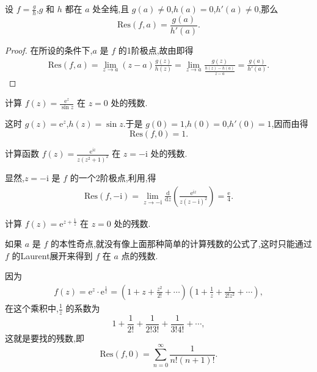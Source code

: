 \documentclass[../../main.tex]{subfiles}
\begin{document}
\begin{proposition}\label{proposition:命题5.4.5}
设 \( f = \frac{g}{h} \),\( g \) 和 \( h \) 都在 \( a \) 处全纯,且 \( g(a) \neq 0 \),\( h(a) = 0 \),\( h'(a) \neq 0 \),那么
\[
\mathrm{Res}(f,a) = \frac{g(a)}{h'(a)}.
\]
\end{proposition}
\begin{proof}
在所设的条件下,\( a \) 是 \( f \) 的1阶极点,故由即得
\begin{align*}
\mathrm{Res}(f,a) = \lim_{z \to a} (z - a) \frac{g(z)}{h(z)} = \lim_{z \to a} \frac{g(z)}{\frac{h(z) - h(a)}{z - a}} = \frac{g(a)}{h'(a)}.
\end{align*}

\end{proof}

\begin{example}
计算 \( f(z) = \frac{\mathrm{e}^z}{\sin z} \) 在 \( z = 0 \) 处的残数.
\end{example}
\begin{solution}
这时 \( g(z) = \mathrm{e}^z \),\( h(z) = \sin z \).于是 \( g(0) = 1 \),\( h(0) = 0 \),\( h'(0) = 1 \),因而由得
\[
\mathrm{Res}(f,0) = 1.
\]

\end{solution}

\begin{example}
计算函数 \( f(z) = \frac{\mathrm{e}^{\mathrm{i}z}}{z(z^2 + 1)^2} \) 在 \( z = -\mathrm{i} \) 处的残数.
\end{example}
\begin{solution}
显然,\( z = -\mathrm{i} \) 是 \( f \) 的一个2阶极点,利用,得
\begin{align*}
\mathrm{Res}(f, -\mathrm{i}) = \lim_{z \to -\mathrm{i}} \frac{\mathrm{d}}{\mathrm{d}z} \left( \frac{\mathrm{e}^{\mathrm{i}z}}{z(z - \mathrm{i})^2} \right) = \frac{\mathrm{e}}{4}.
\end{align*}

\end{solution}

\begin{example}
计算 \( f(z) = \mathrm{e}^{z + \frac{1}{z}} \) 在 \( z = 0 \) 处的残数.
\end{example}
\begin{remark}
如果 \( a \) 是 \( f \) 的本性奇点,就没有像上面那种简单的计算残数的公式了,这时只能通过 \( f \) 的Laurent展开来得到 \( f \) 在 \( a \) 点的残数.
\end{remark}
\begin{solution}
因为
\begin{align*}
f(z) = \mathrm{e}^z \cdot \mathrm{e}^{\frac{1}{z}} = \left( 1 + z + \frac{z^2}{2!} + \cdots \right) \left( 1 + \frac{1}{z} + \frac{1}{2! z^2} + \cdots \right),
\end{align*}
在这个乘积中,\( \frac{1}{z} \) 的系数为
\[
1 + \frac{1}{2!} + \frac{1}{2! 3!} + \frac{1}{3! 4!} + \cdots,
\]
这就是要找的残数,即
\[
\mathrm{Res}(f,0) = \sum_{n = 0}^{\infty} \frac{1}{n! (n + 1)!}.
\]

\end{solution}
\end{document}
